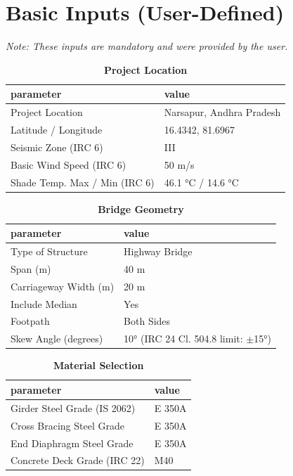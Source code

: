 \documentclass[12pt,a4paper]{report}
\numberwithin{table}{chapter}
\numberwithin{figure}{chapter}
\begin{document}
\section{Basic Inputs (User-Defined)}
\label{sec:basic-inputs}

\noindent\textit{Note: These inputs are mandatory and were provided by the user.}

\begin{table}[H]
\caption{\textbf{Project Location}}
\label{subsec:project-location}
\begin{tabular}{|L{5.5cm}|L{8.5cm}|}
\hline
\textbf{parameter} & \textbf{value} \\
\hline
\textnormal{Project Location} & Narsapur, Andhra Pradesh \\
\hline
\textnormal{Latitude / Longitude} & 16.4342, 81.6967 \\
\hline
\textnormal{Seismic Zone (IRC 6)} & III \\
\hline
\textnormal{Basic Wind Speed (IRC 6)} & 50 m/s \\
\hline
\textnormal{Shade Temp. Max / Min (IRC 6)} & 46.1 °C / 14.6 °C \\
\hline
\end{tabular}
\vspace{0.4cm}
\end{table}

\begin{table}[H]
\caption{\textbf{Bridge Geometry}}
\label{subsec:bridge-geometry}
\begin{tabular}{|L{5.5cm}|L{8.5cm}|}
\hline
\textbf{parameter} & \textbf{value} \\
\hline
\textnormal{Type of Structure} & Highway Bridge \\
\hline
\textnormal{Span (m)} & 40 m \\
\hline
\textnormal{Carriageway Width (m)} & 20 m \\
\hline
\textnormal{Include Median} & Yes \\
\hline
\textnormal{Footpath} & Both Sides \\
\hline
\textnormal{Skew Angle (degrees)} & 10° (IRC 24 Cl. 504.8 limit: $\pm$15°) \\
\hline
\end{tabular}
\end{table}
\vspace{0.4cm}

\begin{table}[H]
\caption{\textbf{Material Selection}}
\label{subsec:material}
\begin{tabular}{|L{5.5cm}|L{8.5cm}|}
\hline
\textbf{parameter} & \textbf{value} \\
\hline
\textnormal{Girder Steel Grade (IS 2062)} & E 350A \\
\hline
\textnormal{Cross Bracing Steel Grade} & E 350A \\
\hline
\textnormal{End Diaphragm Steel Grade} & E 350A \\
\hline
\textnormal{Concrete Deck Grade (IRC 22)} & M40 \\
\hline
\end{tabular}
\end{table}
\vspace{0.4cm}
\end{document}
